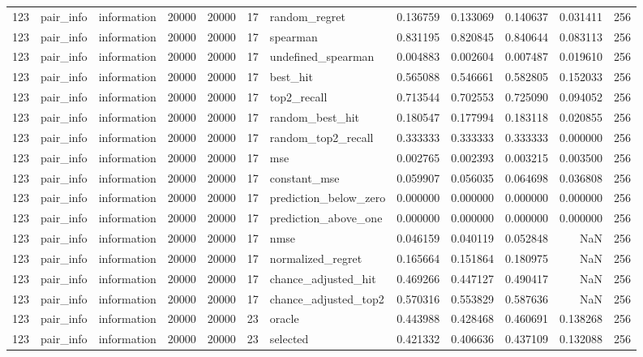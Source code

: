 \begin{tabular}{rllrrrlrrrrr}
123 & pair_info & information & 20000 & 20000 & 17 & random_regret & 0.136759 & 0.133069 & 0.140637 & 0.031411 & 256 \\
123 & pair_info & information & 20000 & 20000 & 17 & spearman & 0.831195 & 0.820845 & 0.840644 & 0.083113 & 256 \\
123 & pair_info & information & 20000 & 20000 & 17 & undefined_spearman & 0.004883 & 0.002604 & 0.007487 & 0.019610 & 256 \\
123 & pair_info & information & 20000 & 20000 & 17 & best_hit & 0.565088 & 0.546661 & 0.582805 & 0.152033 & 256 \\
123 & pair_info & information & 20000 & 20000 & 17 & top2_recall & 0.713544 & 0.702553 & 0.725090 & 0.094052 & 256 \\
123 & pair_info & information & 20000 & 20000 & 17 & random_best_hit & 0.180547 & 0.177994 & 0.183118 & 0.020855 & 256 \\
123 & pair_info & information & 20000 & 20000 & 17 & random_top2_recall & 0.333333 & 0.333333 & 0.333333 & 0.000000 & 256 \\
123 & pair_info & information & 20000 & 20000 & 17 & mse & 0.002765 & 0.002393 & 0.003215 & 0.003500 & 256 \\
123 & pair_info & information & 20000 & 20000 & 17 & constant_mse & 0.059907 & 0.056035 & 0.064698 & 0.036808 & 256 \\
123 & pair_info & information & 20000 & 20000 & 17 & prediction_below_zero & 0.000000 & 0.000000 & 0.000000 & 0.000000 & 256 \\
123 & pair_info & information & 20000 & 20000 & 17 & prediction_above_one & 0.000000 & 0.000000 & 0.000000 & 0.000000 & 256 \\
123 & pair_info & information & 20000 & 20000 & 17 & nmse & 0.046159 & 0.040119 & 0.052848 & NaN & 256 \\
123 & pair_info & information & 20000 & 20000 & 17 & normalized_regret & 0.165664 & 0.151864 & 0.180975 & NaN & 256 \\
123 & pair_info & information & 20000 & 20000 & 17 & chance_adjusted_hit & 0.469266 & 0.447127 & 0.490417 & NaN & 256 \\
123 & pair_info & information & 20000 & 20000 & 17 & chance_adjusted_top2 & 0.570316 & 0.553829 & 0.587636 & NaN & 256 \\
123 & pair_info & information & 20000 & 20000 & 23 & oracle & 0.443988 & 0.428468 & 0.460691 & 0.138268 & 256 \\
123 & pair_info & information & 20000 & 20000 & 23 & selected & 0.421332 & 0.406636 & 0.437109 & 0.132088 & 256 \\

\end{tabular}
